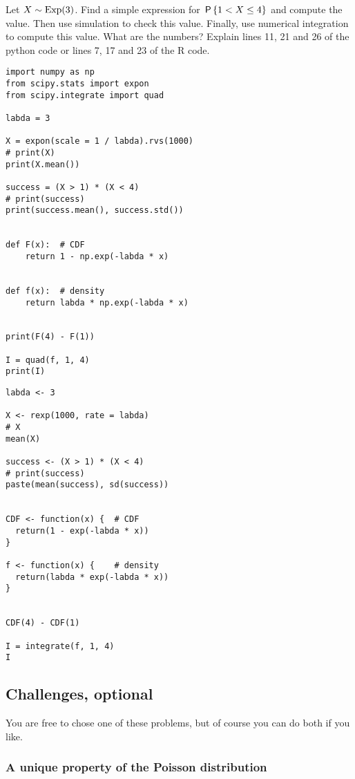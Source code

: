 \documentclass[assignments]{subfiles}
\begin{document}
\begin{exercise}
Let $X\sim\Exp{3}$.
Find a simple expression for $\P{1 < X \leq 4}$ and compute the value.
Then use simulation to check this value.
Finally, use numerical integration to compute this value. What are the numbers? Explain lines 11, 21 and 26 of the python code or lines 7, 17 and 23 of the R code.

\begin{verbatim}
import numpy as np
from scipy.stats import expon
from scipy.integrate import quad

labda = 3

X = expon(scale = 1 / labda).rvs(1000)
# print(X)
print(X.mean())

success = (X > 1) * (X < 4)
# print(success)
print(success.mean(), success.std())


def F(x):  # CDF
    return 1 - np.exp(-labda * x)


def f(x):  # density
    return labda * np.exp(-labda * x)


print(F(4) - F(1))

I = quad(f, 1, 4)
print(I)
\end{verbatim}



\begin{verbatim}
labda <- 3

X <- rexp(1000, rate = labda)
# X
mean(X)

success <- (X > 1) * (X < 4)
# print(success)
paste(mean(success), sd(success))


CDF <- function(x) {  # CDF
  return(1 - exp(-labda * x))
}

f <- function(x) {    # density
  return(labda * exp(-labda * x))
}


CDF(4) - CDF(1)

I = integrate(f, 1, 4)
I
\end{verbatim}


\end{exercise}


\subsection{Challenges, optional}
\label{sec:above-exam-level}

You are free to chose one of these problems, but of course you can do both if you like.

\subsubsection{A unique property of the Poisson distribution}
\end{document}
